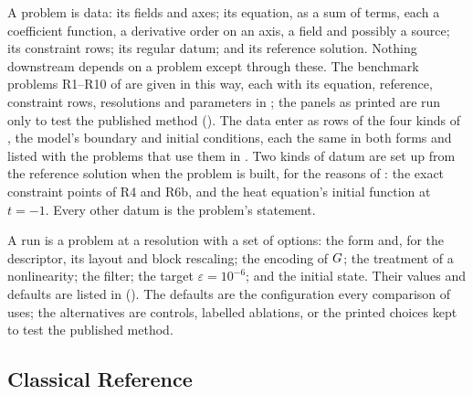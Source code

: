 A problem is data: its fields and axes; its equation, as a sum of terms, each a coefficient function, a derivative order on an axis, a field and possibly a source; its constraint rows; its regular datum; and its reference solution. Nothing downstream depends on a problem except through these. The benchmark problems R1--R10 of  are given in this way, each with its equation, reference, constraint rows, resolutions and parameters in ; the panels as printed are run only to test the published method (). The data enter as rows of the four kinds of , the model's boundary and initial conditions, each the same in both forms and listed with the problems that use them in . Two kinds of datum are set up from the reference solution when the problem is built, for the reasons of : the exact constraint points of R4 and R6b, and the heat equation's initial function at $t=-1$. Every other datum is the problem's statement.


A run is a problem at a resolution with a set of options: the form and, for the descriptor, its layout and block rescaling; the encoding of $G$; the treatment of a nonlinearity; the filter; the target $\varepsilon=10^{-6}$; and the initial state. Their values and defaults are listed in  (). The defaults are the configuration every comparison of  uses; the alternatives are controls, labelled ablations, or the printed choices kept to test the published method.

\subsection{Classical Reference}
\label{sec:pipeline-reference}

